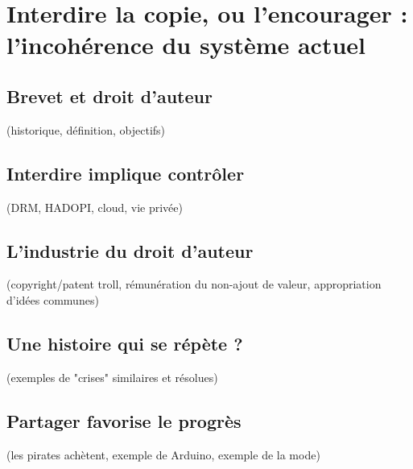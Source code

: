 \chapter{Interdire la copie, ou l'encourager : l'incohérence du système actuel}

\section{Brevet et droit d'auteur}
(historique, définition, objectifs)
\section{Interdire implique contrôler}
(DRM, HADOPI, cloud, vie privée)
\section{L'industrie du droit d'auteur}
(copyright/patent troll, rémunération du non-ajout de valeur, appropriation d'idées communes)
\section{Une histoire qui se répète ?}
(exemples de "crises" similaires et résolues)
\section{Partager favorise le progrès}
(les pirates achètent, exemple de Arduino, exemple de la mode)
